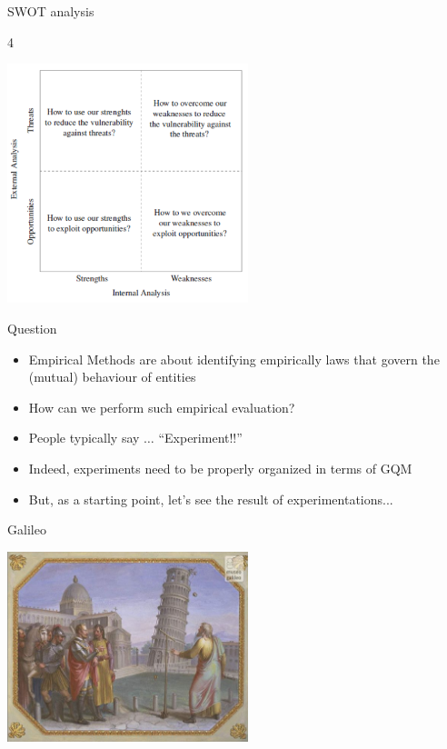 \documentclass{beamer}
\begin{document}
\begin{frame}{\centerline{SWOT analysis}}
4

\begin{center}
\includegraphics[width=70mm]{A2022.IDSEPC.SperimentazioneDeduzione/image-07.png}
\end{center}
\end{frame}



\begin{frame}
{\centerline{Question}}

\begin{itemize}
\item Empirical Methods are about identifying empirically laws that govern the (mutual) behaviour of entities
\item How can we perform such empirical evaluation?
\item People typically say $\ldots$ ``Experiment!!''
\item Indeed, experiments need to be properly organized in terms of GQM
\item But, as a starting point, let's see the result of experimentations...
\end{itemize}


\end{frame}

\begin{frame}
{\centerline{Galileo}}

\begin{center}
\includegraphics[width=7cm]{A2022.IDSEPC.SperimentazioneDeduzione/Galileo.png}
\end{center} 

\end{frame}
\end{document}
